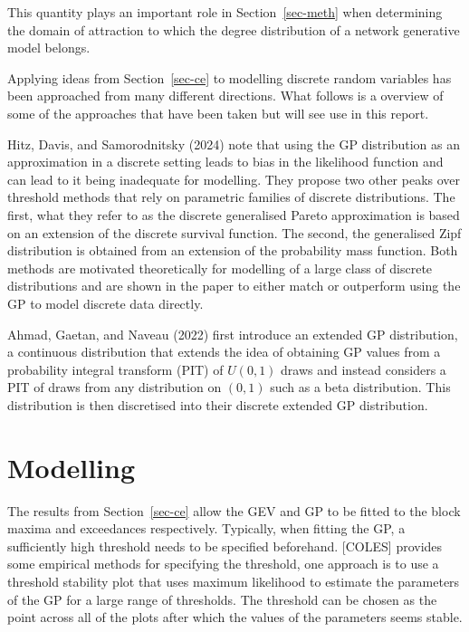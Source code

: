 \documentclass[
  10pt,
  a4paper,
]{scrreprt}
\theoremstyle{plain}
\theoremstyle{definition}
\theoremstyle{remark}
\begin{document}
{This quantity plays an important role in Section~\ref{sec-meth} when
determining the domain of attraction to which the degree distribution of
a network generative model belongs.

Applying ideas from Section~\ref{sec-ce} to modelling discrete random
variables has been approached from many different directions. What
follows is a overview of some of the approaches that have been taken but
will see use in this report.

Hitz, Davis, and Samorodnitsky (2024) note that using the GP
distribution as an approximation in a discrete setting leads to bias in
the likelihood function and can lead to it being inadequate for
modelling. They propose two other peaks over threshold methods that rely
on parametric families of discrete distributions. The first, what they
refer to as the discrete generalised Pareto approximation is based on an
extension of the discrete survival function. The second, the generalised
Zipf distribution is obtained from an extension of the probability mass
function. Both methods are motivated theoretically for modelling of a
large class of discrete distributions and are shown in the paper to
either match or outperform using the GP to model discrete data directly.

Ahmad, Gaetan, and Naveau (2022) first introduce an extended GP
distribution, a continuous distribution that extends the idea of
obtaining GP values from a probability integral transform (PIT) of
\(U(0,1)\) draws and instead considers a PIT of draws from any
distribution on \((0,1)\) such as a beta distribution. This distribution
is then discretised into their discrete extended GP distribution.

\hypertarget{sec-mod}{%
\section{Modelling}\label{sec-mod}}

The results from Section~\ref{sec-ce} allow the GEV and GP to be fitted
to the block maxima and exceedances respectively. Typically, when
fitting the GP, a sufficiently high threshold needs to be specified
beforehand. {[}COLES{]} provides some empirical methods for specifying
the threshold, one approach is to use a threshold stability plot that
uses maximum likelihood to estimate the parameters of the GP for a large
range of thresholds. The threshold can be chosen as the point across all
of the plots after which the values of the parameters seems stable.

}
\end{document}
